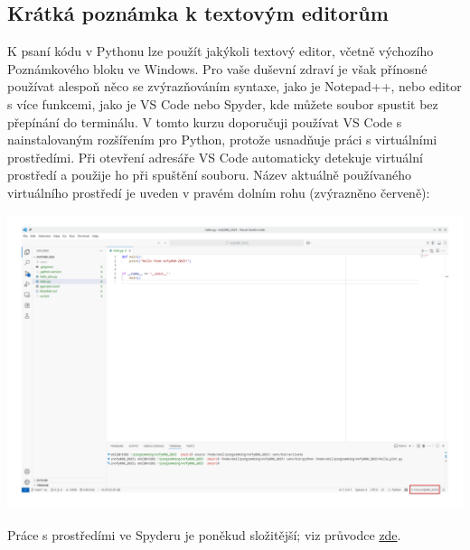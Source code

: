 \subsection{Krátká poznámka k textovým editorům}
K psaní kódu v Pythonu lze použít jakýkoli textový editor, včetně výchozího Poznámkového bloku ve Windows. Pro vaše duševní zdraví je však přínosné používat alespoň něco se zvýrazňováním syntaxe, jako je Notepad++, nebo editor s více funkcemi, jako je VS Code nebo Spyder, kde můžete soubor spustit bez přepínání do terminálu. V tomto kurzu doporučuji používat VS Code s nainstalovaným rozšířením pro Python, protože usnadňuje práci s virtuálními prostředími. Při otevření adresáře VS Code automaticky detekuje virtuální prostředí a použije ho při spuštění souboru. Název aktuálně používaného virtuálního prostředí je uveden v pravém dolním rohu (zvýrazněno červeně):
\begin{center}
    \includegraphics[width=0.9\linewidth]{vscode.png}
\end{center}

Práce s prostředími ve Spyderu je poněkud složitější; viz průvodce \href{https://github.com/spyder-ide/spyder/wiki/Working-with-packages-and-environments-in-Spyder#working-with-other-environments-and-python-installations}{zde}.

